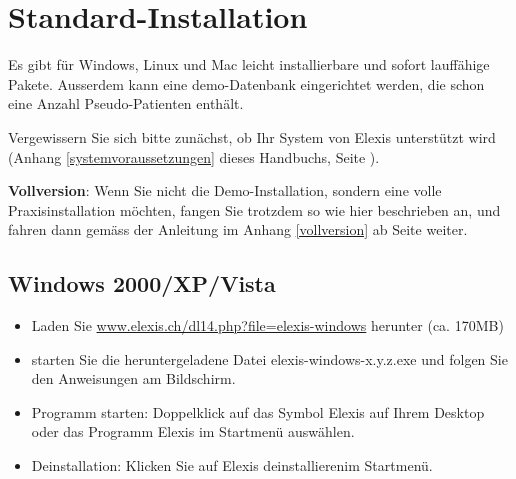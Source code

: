 
\section{Standard-Installation}
\label{easyistall}
Es gibt für Windows, Linux und Mac leicht installierbare und sofort lauffähige Pakete. Ausserdem kann eine demo-Datenbank eingerichtet werden, die schon eine Anzahl Pseudo-Patienten enthält.


Vergewissern Sie sich bitte zunächst, ob Ihr System von Elexis unterstützt wird (Anhang \ref{systemvoraussetzungen} dieses Handbuchs, Seite \pageref{systemvoraussetzungen}).\par
{}
\textbf{Vollversion}: Wenn Sie nicht die Demo-Installation, sondern eine volle Praxisinstallation möchten, fangen Sie trotzdem so wie hier beschrieben an, und fahren dann gemäss der Anleitung im Anhang \ref{vollversion} ab Seite \pageref{vollversion} weiter.
\subsection{Windows 2000/XP/Vista}
\begin{itemize}
	\item Laden Sie \href{http://www.elexis.ch/dl14.php?file=elexis-windows}{www.elexis.ch/dl14.php?file=elexis-windows} herunter (ca. 170MB)
	\item starten Sie die heruntergeladene Datei elexis-windows-x.y.z.exe und folgen Sie den Anweisungen am Bildschirm.
    \item Programm starten: Doppelklick auf das Symbol \glqq Elexis\grqq{} auf Ihrem Desktop oder das Programm \glqq Elexis\grqq{} im Startmenü auswählen.
	\item Deinstallation: Klicken Sie auf \glqq Elexis deinstallieren\grqq im  Startmenü.
\end{itemize}

